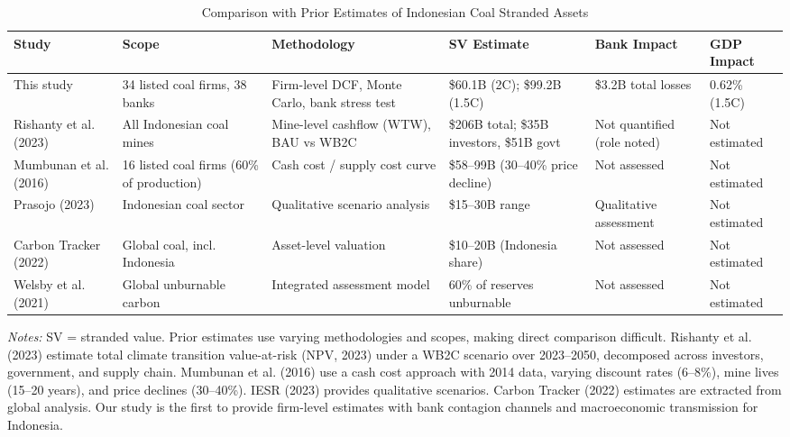 \begin{table}[htbp]
\centering
\caption{Comparison with Prior Estimates of Indonesian Coal Stranded Assets}
\label{tab:comparison}
\footnotesize
\begin{tabular}{p{2.5cm}p{2.2cm}p{2.2cm}p{2.0cm}p{1.8cm}p{1.5cm}}
\toprule
Study & Scope & Methodology & SV Estimate & Bank Impact & GDP Impact \\
\midrule
This study & 34 listed coal firms, 38 banks & Firm-level DCF, Monte Carlo, bank stress test & \$60.1B (2\textdegree{}C); \$99.2B (1.5\textdegree{}C) & \$3.2B total losses & 0.62\% (1.5\textdegree{}C) \\[6pt]
Rishanty et al. (2023) & All Indonesian coal mines & Mine-level cashflow (WTW), BAU vs WB2C & \$206B total; \$35B investors, \$51B govt & Not quantified (role noted) & Not estimated \\[6pt]
Mumbunan et al. (2016) & 16 listed coal firms (60\% of production) & Cash cost / supply cost curve & \$58--99B (30--40\% price decline) & Not assessed & Not estimated \\[6pt]
Prasojo (2023) & Indonesian coal sector & Qualitative scenario analysis & \$15--30B range & Qualitative assessment & Not estimated \\[6pt]
Carbon Tracker (2022) & Global coal, incl. Indonesia & Asset-level valuation & \$10--20B (Indonesia share) & Not assessed & Not estimated \\[6pt]
Welsby et al. (2021) & Global unburnable carbon & Integrated assessment model & 60\% of reserves unburnable & Not assessed & Not estimated \\
\bottomrule
\end{tabular}

\smallskip
\noindent \textit{Notes:} SV = stranded value. Prior estimates use varying methodologies and scopes, making direct comparison difficult. Rishanty et al. (2023) estimate total climate transition value-at-risk (NPV, 2023) under a WB2C scenario over 2023--2050, decomposed across investors, government, and supply chain. Mumbunan et al. (2016) use a cash cost approach with 2014 data, varying discount rates (6--8\%), mine lives (15--20 years), and price declines (30--40\%). IESR (2023) provides qualitative scenarios. Carbon Tracker (2022) estimates are extracted from global analysis. Our study is the first to provide firm-level estimates with bank contagion channels and macroeconomic transmission for Indonesia.
\end{table}
